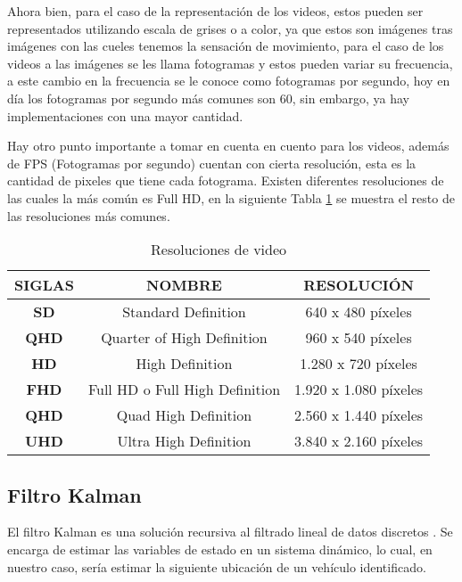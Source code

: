 Ahora bien, para el caso de la representación de los videos, estos pueden ser representados utilizando escala de grises o a color, ya que estos son imágenes tras imágenes con las cueles tenemos la sensación de movimiento, para el caso de los videos a las imágenes se les llama fotogramas y estos pueden variar su frecuencia, a este cambio en la frecuencia se le conoce como fotogramas por segundo, hoy en día los fotogramas por segundo más comunes son 60, sin embargo, ya hay implementaciones con una mayor cantidad.

Hay otro punto importante a tomar en cuenta en cuento para los videos, además de FPS (Fotogramas por segundo) cuentan con cierta resolución, esta es la cantidad de pixeles que tiene cada fotograma. Existen diferentes resoluciones de las cuales la más común es Full HD, en la siguiente Tabla \ref{tab:resolutions} se muestra el resto de las resoluciones más comunes.

\begin{table}[H]
    \caption{Resoluciones de video}
    \centering
    \label{tab:resolutions}
    \begin{tabular}{|c|c|c|}
    \hline
    \textbf{SIGLAS} & \textbf{NOMBRE} & \textbf{RESOLUCIÓN} \\ \hline
    \textbf{SD}     & Standard Definition & 640 x 480 píxeles \\ \hline
    \textbf{QHD}    & Quarter of High Definition & 960 x 540 píxeles \\ \hline
    \textbf{HD}     & High Definition & 1.280 x 720 píxeles \\ \hline
    \textbf{FHD}    & Full HD o Full High Definition & 1.920 x 1.080 píxeles \\ \hline
    \textbf{QHD}    & Quad High Definition & 2.560 x 1.440 píxeles \\ \hline
    \textbf{UHD}    & Ultra High Definition & 3.840 x 2.160 píxeles \\ \hline
    \end{tabular}
\end{table}

\subsection{Filtro Kalman}

El filtro Kalman es una solución recursiva al filtrado lineal de datos discretos \cite{welch1995introduction}. Se encarga de estimar las variables de estado en un sistema dinámico, lo cual, en nuestro caso, sería estimar la siguiente ubicación de un vehículo identificado.

